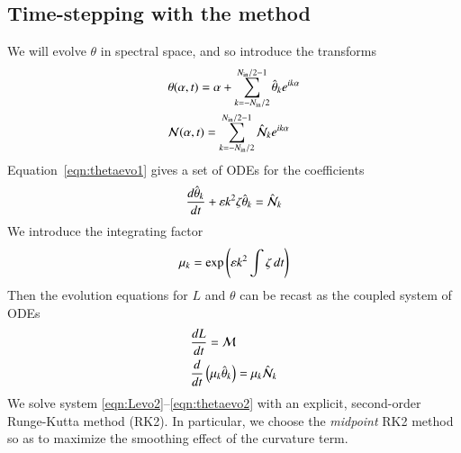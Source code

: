 \documentclass[preprint, 10pt]{elsarticle}
\begin{document}
\subsection{Time-stepping with the {\thL} method} 
We will evolve $\theta$ in spectral space, and so introduce the transforms
\begin{align}
& \theta(\alpha,t) = \alpha + \sum_{k = -N_{\mathrm{in}} /2}^{N_{\mathrm{in}} /2-1} \hat{\theta}_k e^{ i k \alpha} \\
& \mathcal{N}(\alpha,t)  = \sum_{k = -N_{\mathrm{in}} /2}^{N_{\mathrm{in}} /2-1} \hat{\mathcal{N}}_k e^{ i k \alpha}
\end{align}
Equation~\eqref{eqn:thetaevo1} gives a set of ODEs for the coefficients
\begin{equation}
\frac{d \hat{\theta}_k}{d t} +  \varepsilon k^2  \zeta \hat{\theta}_k = \hat{\mathcal{N}}_k
\end{equation}
We introduce the integrating factor
\begin{equation}
\label{eq:mu}
\mu_k = \exp \left( \varepsilon k^2 \int \zeta \, dt \right)
\end{equation}
Then the evolution equations for $L$ and $\theta$ can be recast as the coupled system of ODEs
\begin{align}
\label{eqn:Levo2}
& \frac{d L}{d t} = \mathcal{M} \\
\label{eqn:thetaevo2}
& \frac{d }{d t}\left( \mu_k \hat{\theta}_k \right) = \mu_k \hat{\mathcal{N}}_k
\end{align}
We solve system \eqref{eqn:Levo2}--\eqref{eqn:thetaevo2} with an explicit, second-order Runge-Kutta method (RK2). In particular, we choose the {\em midpoint} RK2 method so as to maximize the smoothing effect of the curvature term.
\end{document}
